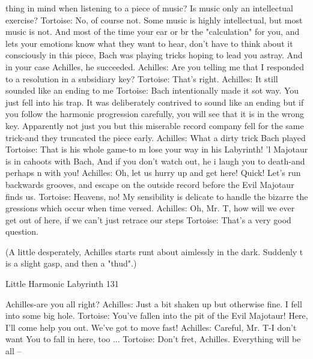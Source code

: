                     thing in mind when listening to a piece of music? Is music only an
                    intellectual exercise?
               Tortoise: No, of course not. Some music is highly intellectual, but most
                      music is not. And most of the time your ear or br the
                      "calculation" for you, and lets your emotions know what they
                      want to hear, don't have to think about it consciously in this
                      piece, Bach was playing tricks hoping to lead you astray. And in
                      your case Achilles, he succeeded.
               Achilles: Are you telling me that I responded to a resolution in a
                      subsidiary key?
               Tortoise: That's right.
               Achilles: It still sounded like an ending to me
               Tortoise: Bach intentionally made it sot way. You just fell into his trap.
                      It was deliberately contrived to sound like an ending but if you
                      follow the harmonic progression carefully, you will see that it is
                      in the wrong key. Apparently not just you but this miserable
                      record company fell for the same trick-and they truncated the
                      piece early.
               Achilles: What a dirty trick Bach played
               Tortoise: That is his whole game-to m lose your way in his Labyrinth! 'l
                      Majotaur is in cahoots with Bach, And if you don't watch out, he
                      i laugh you to death-and perhaps n with you!
               Achilles: Oh, let us hurry up and get here! Quick! Let's run backwards
                      grooves, and escape on the outside record before the Evil
                      Majotaur finds us.
               Tortoise: Heavens, no! My sensibility is delicate to handle the bizarre the
                      gressions which occur when time versed.
               Achilles: Oh, Mr. T, how will we ever get out of here, if we can't just
                      retrace our steps
               Tortoise: That's a very good question.

                  (A little desperately, Achilles starts runt about aimlessly in the dark.
                  Suddenly t is a slight gasp, and then a "thud".)




Little Harmonic Labyrinth                                                             131

               Achilles-are you all right?
               Achilles: Just a bit shaken up but otherwise fine. I fell into some big
                      hole.
               Tortoise: You've fallen into the pit of the Evil Majotaur! Here, I'll come
                      help you out. We've got to move fast!
               Achilles: Careful, Mr. T-I don't want You to fall in here, too ...
               Tortoise: Don't fret, Achilles. Everything will be all --

